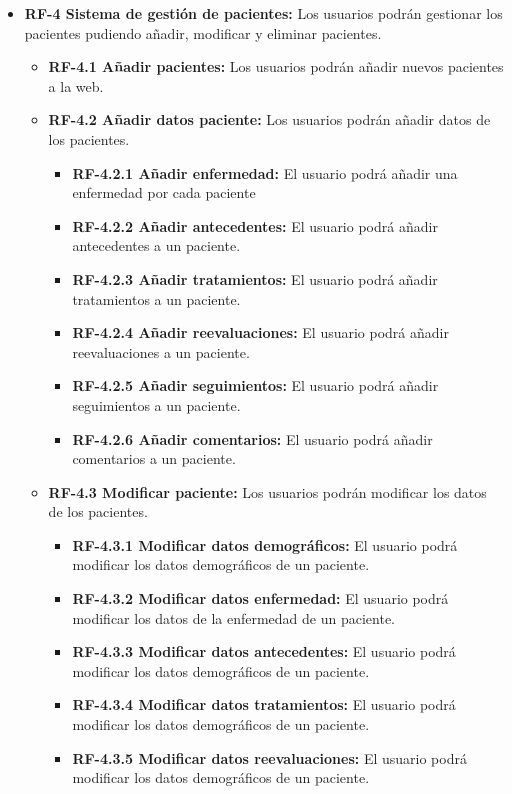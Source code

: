 \begin{itemize}
\begin{itemize}
    \end{itemize}
    \item \textbf{RF-4 Sistema de gestión de pacientes:} Los usuarios podrán
    gestionar los pacientes pudiendo añadir, modificar y eliminar pacientes.
    \begin{itemize}
        \item \textbf{RF-4.1 Añadir pacientes:} Los usuarios podrán añadir nuevos pacientes a la web.
        \item \textbf{RF-4.2 Añadir datos paciente:} Los usuarios podrán añadir datos de los pacientes.
        \begin{itemize}
            \item \textbf{RF-4.2.1 Añadir enfermedad:} El usuario podrá añadir una enfermedad por cada paciente
            \item \textbf{RF-4.2.2 Añadir antecedentes:} El usuario podrá añadir antecedentes a un paciente.
            \item \textbf{RF-4.2.3 Añadir tratamientos:} El usuario podrá añadir tratamientos a un paciente.
            \item \textbf{RF-4.2.4 Añadir reevaluaciones:} El usuario podrá añadir reevaluaciones a un paciente.
            \item \textbf{RF-4.2.5 Añadir seguimientos:} El usuario podrá añadir seguimientos a un paciente.
            \item \textbf{RF-4.2.6 Añadir comentarios:} El usuario podrá añadir comentarios a un paciente.
        \end{itemize}
        \item \textbf{RF-4.3 Modificar paciente:} Los usuarios podrán modificar los datos de los pacientes.
        \begin{itemize}
            \item \textbf{RF-4.3.1 Modificar datos demográficos:} El usuario podrá modificar los datos demográficos de un paciente.
            \item \textbf{RF-4.3.2 Modificar datos enfermedad:} El usuario podrá modificar los datos de la enfermedad de un paciente.
            \item \textbf{RF-4.3.3 Modificar datos antecedentes:} El usuario podrá modificar los datos demográficos de un paciente.
            \item \textbf{RF-4.3.4 Modificar datos tratamientos:} El usuario podrá modificar los datos demográficos de un paciente.
            \item \textbf{RF-4.3.5 Modificar datos reevaluaciones:} El usuario podrá modificar los datos demográficos de un paciente.

\end{itemize}
\end{itemize}
\end{itemize}
